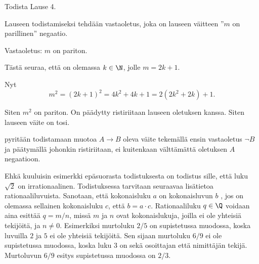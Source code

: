 
\begin{esimerkki}
	Todista Lause 4.

	\begin{todistus}
		Lauseen todistamiseksi tehdään vastaoletus, joka on lauseen väitteen ''$m$ on parillinen'' negaatio.

		Vastaoletus: $m$ on pariton.

		Tästä seuraa, että on olemassa $k\in \N$, jolle $m=2k+1$.

		Nyt
		\[
			m^2 = (2k+1)^2 = 4k^2+4k+1 = 2(2k^2+2k)+1.
		\]

		Siten $m^2$ on pariton. On päädytty ristiriitaan lauseen oletuksen kanssa. Siten lauseen väite on tosi.
	\end{todistus}
\end{esimerkki}

 pyritään todistamaan muotoa $A\to B$ oleva
väite tekemällä ensin vastaoletus $\lnot B$ ja päätymällä johonkin ristiriitaan, ei kuitenkaan
välttämättä oletuksen $A$ negaatioon.

Ehkä kuuluisin esimerkki epäsuorasta todistuksesta on todistus sille, että luku $\sqrt{2}$ on irrationaalinen. 
Todistuksessa tarvitaan seuraavaa lisätietoa rationaaliluvuista. Sanotaan, että kokonaisluku $a$ on kokonaisluvun $b$ 
, jos on olemassa sellainen kokonaisluku $c$, että $b=a\cdot c$. Rationaaliluku $q\in\Q$ voidaan 
aina esittää  $q=m/n$, missä $m$ ja $n$ ovat kokonaislukuja, joilla ei 
ole yhteisiä tekijöitä, ja $n\neq 0$. Esimerkiksi murtoluku $2/5$ on supistetussa muodossa, koska luvuilla $2$ ja $5$ 
ei ole yhteisiä tekijöitä. Sen sijaan murtoluku $6/9$ ei ole supistetussa muodossa, koska luku $3$ on sekä osoittajan 
että nimittäjän tekijä. Murtoluvun $6/9$ esitys supistetussa muodossa on $2/3$.


